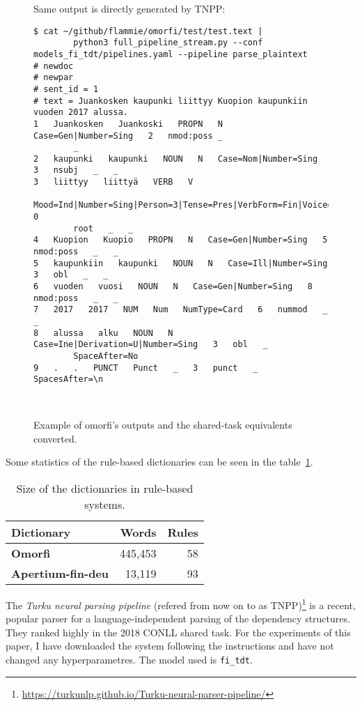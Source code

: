 \documentclass{flammie}
\begin{document}
\begin{figure}
\begin{tiny}
\begin{verbatim}
    \end{verbatim}
Same output is directly generated by TNPP\@:
\begin{verbatim}$ cat ~/github/flammie/omorfi/test/test.text |
        python3 full_pipeline_stream.py --conf models_fi_tdt/pipelines.yaml --pipeline parse_plaintext
# newdoc
# newpar
# sent_id = 1
# text = Juankosken kaupunki liittyy Kuopion kaupunkiin vuoden 2017 alussa.
1   Juankosken   Juankoski   PROPN   N   Case=Gen|Number=Sing   2   nmod:poss _
        _
2   kaupunki   kaupunki   NOUN   N   Case=Nom|Number=Sing   3   nsubj   _   _
3   liittyy   liittyä   VERB   V
        Mood=Ind|Number=Sing|Person=3|Tense=Pres|VerbForm=Fin|Voice=Act   0
        root   _   _
4   Kuopion   Kuopio   PROPN   N   Case=Gen|Number=Sing   5   nmod:poss   _   _
5   kaupunkiin   kaupunki   NOUN   N   Case=Ill|Number=Sing   3   obl   _   _
6   vuoden   vuosi   NOUN   N   Case=Gen|Number=Sing   8   nmod:poss   _   _
7   2017   2017   NUM   Num   NumType=Card   6   nummod   _   _
8   alussa   alku   NOUN   N   Case=Ine|Derivation=U|Number=Sing   3   obl   _
        SpaceAfter=No
9   .   .   PUNCT   Punct   _   3   punct   _   SpacesAfter=\n



        \end{verbatim}
    \end{tiny}
    \caption{Example of omorfi's outputs and the shared-task equivalents
    converted.\label{listing:io-mangling}}
\end{figure}


Some statistics of the rule-based dictionaries can be seen in the
table~\ref{table:dic-sizes}.

\begin{table}
\begin{center}
    \begin{tabular}{lrr}
        \toprule
        Dictionary & \bf Words & \bf Rules\\
        \midrule
        \bf Omorfi & 445,453 & 58 \\
        \bf Apertium-fin-deu & 13,119 & 93 \\
        \bottomrule
    \end{tabular}
    \caption{Size of the dictionaries in rule-based systems.
\label{table:dic-sizes}}
\end{center}
\end{table}

The \textit{Turku neural parsing pipeline} (refered from now on to as
TNPP)\footnote{\url{https://turkunlp.github.io/Turku-neural-parser-pipeline/}}
is a recent, popular parser for a language-independent parsing of the dependency
structures. They ranked highly in the 2018 CONLL shared task. For the
experiments of this paper, I have downloaded the system following the
instructions and have not changed any hyperparametres.  The model used is
\texttt{fi\_tdt}.
\end{document}
